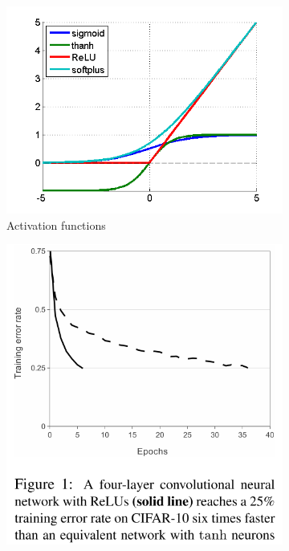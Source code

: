 \documentclass[a4paper,11pt]{article}
\begin{document}
\begin{figure}
    \centering
    \begin{minipage}[b]{\textwidth}
      \begin{subfigure}{.5\textwidth} 
        \centering
        \includegraphics[scale=0.5]{images/activation_functions.png}
        \caption{Activation functions}\label{fig:2a}
      \end{subfigure}%
      \begin{subfigure}{.5\textwidth} 
        \centering
        \includegraphics[scale=0.35]{images/ReLU_train_fast.png}

\end{subfigure}
\end{minipage}
\end{figure}
\end{document}
